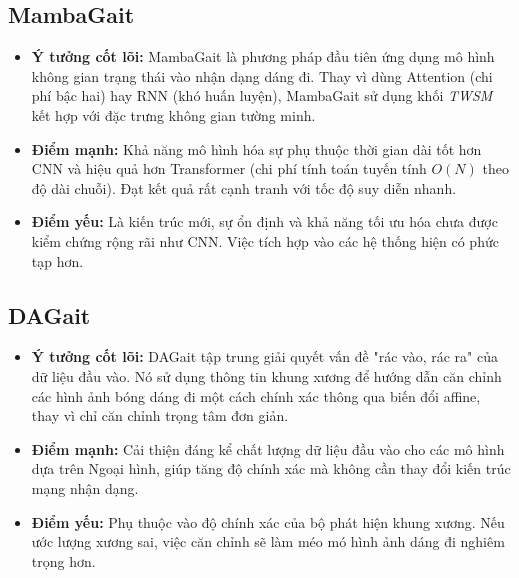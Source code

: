 \subsection{MambaGait}
\begin{itemize}
  \item \textbf{Ý tưởng cốt lõi:}
        MambaGait \cite{xiong2025mambagait} là phương pháp đầu tiên ứng dụng mô hình không gian trạng thái vào nhận dạng dáng đi. Thay vì dùng Attention (chi phí bậc hai) hay RNN (khó huấn luyện), MambaGait sử dụng khối \textit{TWSM} kết hợp với đặc trưng không gian tường minh.
  \item \textbf{Điểm mạnh:}
        Khả năng mô hình hóa sự phụ thuộc thời gian dài tốt hơn CNN và hiệu quả hơn Transformer (chi phí tính toán tuyến tính $O(N)$ theo độ dài chuỗi). Đạt kết quả rất cạnh tranh với tốc độ suy diễn nhanh.
  \item \textbf{Điểm yếu:}
        Là kiến trúc mới, sự ổn định và khả năng tối ưu hóa chưa được kiểm chứng rộng rãi như CNN. Việc tích hợp vào các hệ thống hiện có phức tạp hơn.
\end{itemize}

\subsection{DAGait}
\begin{itemize}
  \item \textbf{Ý tưởng cốt lõi:}
        DAGait \cite{wu2025dagait} tập trung giải quyết vấn đề "rác vào, rác ra" của dữ liệu đầu vào. Nó sử dụng thông tin khung xương để hướng dẫn căn chỉnh các hình ảnh bóng dáng đi một cách chính xác thông qua biến đổi affine, thay vì chỉ căn chỉnh trọng tâm đơn giản.
  \item \textbf{Điểm mạnh:}
        Cải thiện đáng kể chất lượng dữ liệu đầu vào cho các mô hình dựa trên Ngoại hình, giúp tăng độ chính xác mà không cần thay đổi kiến trúc mạng nhận dạng.
  \item \textbf{Điểm yếu:}
        Phụ thuộc vào độ chính xác của bộ phát hiện khung xương. Nếu ước lượng xương sai, việc căn chỉnh sẽ làm méo mó hình ảnh dáng đi nghiêm trọng hơn.
\end{itemize}

